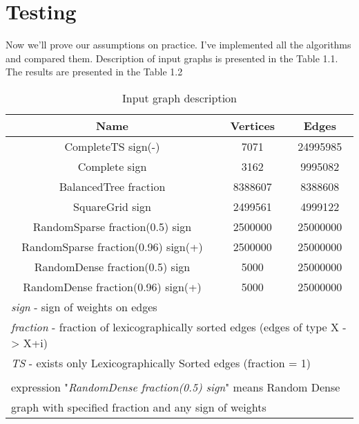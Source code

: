 \FloatBarrier
\section{Testing}

Now we'll prove our assumptions on practice. I've implemented all the algorithms and compared them. Description of input graphs is presented in the Table 1.1. The results are presented in the Table 1.2
\FloatBarrier

\begin{table}[H]
\centering

\begin{tabular}{c|c|c}  
Name & Vertices & Edges\\
\hline\hline
CompleteTS sign(-) & 7071 & 24995985 \\  
Complete sign & 3162 & 9995082  \\  
BalancedTree fraction & 8388607 & 8388608 \\  
SquareGrid sign & 2499561 & 4999122  \\  
RandomSparse fraction(0.5) sign & 2500000 & 25000000  \\  
RandomSparse fraction(0.96) sign(+) & 2500000 & 25000000  \\  
RandomDense fraction(0.5) sign & 5000 & 25000000  \\  
RandomDense fraction(0.96) sign(+) & 5000 & 25000000  \\  
\hline
\multicolumn{3}{l}{\footnotesize \textit{sign} - sign of weights on edges }\\
\multicolumn{3}{l}{\footnotesize \textit{fraction} - fraction of lexicographically sorted edges (edges of type X -> X+i) }\\
\multicolumn{3}{l}{\footnotesize \textit{TS} - exists only Lexicographically Sorted edges (fraction = 1) }\\
\multicolumn{3}{l}{\footnotesize }\\
\multicolumn{3}{l}{\footnotesize  expression "\textit{RandomDense fraction(0.5) sign}" means Random Dense }\\
\multicolumn{3}{l}{\footnotesize 	graph with specified fraction and any sign of weights}\\
\end{tabular}

\caption{Input graph description}
\label{bf_algo_comparison}
\end{table}
\FloatBarrier

